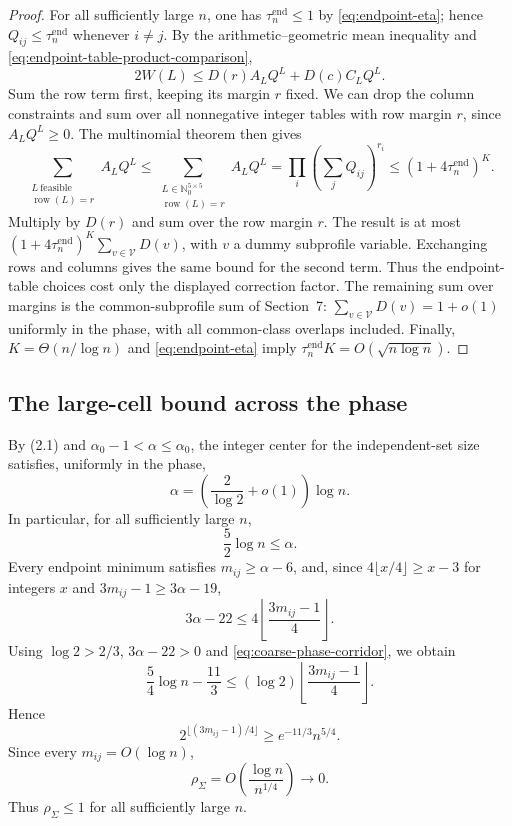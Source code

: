 \documentclass[a4paper,10pt,reqno]{amsart}
\numberwithin{equation}{section}
\theoremstyle{plain}
\theoremstyle{remark}
\begin{document}
\begin{proof}
For all sufficiently large $n$, one has $\tau_n^{\mathrm{end}}\le1$ by
\eqref{eq:endpoint-eta}; hence $Q_{ij}\le\tau_n^{\mathrm{end}}$ whenever
$i\ne j$.
By the arithmetic--geometric mean inequality and
\eqref{eq:endpoint-table-product-comparison},
\[
  2W(L)
  \le
  D(r)A_LQ^L+D(c)C_LQ^L.
\]
Sum the row term first, keeping its margin $r$ fixed. We can drop the
column constraints and sum over all nonnegative integer tables with
row margin $r$, since $A_LQ^L\ge0$. The multinomial theorem then gives
\[
  \sum_{\substack{L\ \mathrm{feasible}\\
                  \operatorname{row}(L)=r}}A_LQ^L
  \le
  \sum_{\substack{L\in\mathbb N_0^{5\times5}\\
                  \operatorname{row}(L)=r}}A_LQ^L
  =
  \prod_i\left(\sum_jQ_{ij}\right)^{r_i}
  \le
  (1+4\tau_n^{\mathrm{end}})^K.
\]
Multiply by $D(r)$ and sum over the row margin $r$. The result is at most
$(1+4\tau_n^{\mathrm{end}})^K\sum_{v\in\mathcal V}D(v)$, with $v$ a dummy
subprofile variable. Exchanging rows and columns gives the same bound for
the second term. Thus the endpoint-table choices cost only the displayed
correction factor. The remaining sum over margins is the common-subprofile
sum of Section~7:
$\sum_{v\in\mathcal V}D(v)=1+o(1)$ uniformly in the phase, with all
common-class overlaps included. Finally, $K=\Theta(n/\log n)$ and
\eqref{eq:endpoint-eta} imply
$\tau_n^{\mathrm{end}}K=O(\sqrt{n\log n})$.
\end{proof}

\subsection{The large-cell bound across the phase}

By (2.1) and $\alpha_0-1<\alpha\le\alpha_0$, the integer center for the
independent-set size satisfies, uniformly in the phase,
\[
  \alpha
  =
  \left(\frac{2}{\log 2}+o(1)\right)\log n.
\]
In particular, for all sufficiently large $n$,
\begin{equation}
  \frac52\log n\le\alpha.
  \label{eq:coarse-phase-corridor}
\end{equation}
Every endpoint minimum satisfies $m_{ij}\ge\alpha-6$, and, since
$4\lfloor x/4\rfloor\ge x-3$ for integers $x$ and $3m_{ij}-1\ge3\alpha-19$,
\[
  3\alpha-22
  \le
  4\left\lfloor\frac{3m_{ij}-1}{4}\right\rfloor.
\]
Using $\log 2>2/3$, $3\alpha-22>0$ and \eqref{eq:coarse-phase-corridor}, we
obtain
\begin{equation}
  \frac54\log n-\frac{11}{3}
  \le
  (\log 2)
  \left\lfloor\frac{3m_{ij}-1}{4}\right\rfloor.
  \label{eq:coarse-log-budget}
\end{equation}
Hence
\[
  2^{\lfloor(3m_{ij}-1)/4\rfloor}
  \ge
  e^{-11/3}n^{5/4}.
\]
Since every $m_{ij}=O(\log n)$,
\begin{equation}
  \rho_{\Sigma}
  =O\!\left(\frac{\log n}{n^{1/4}}\right)
  \longrightarrow0.
  \label{eq:rho-sum-small}
\end{equation}
Thus $\rho_{\Sigma}\le1$ for all sufficiently large $n$.
\end{document}
